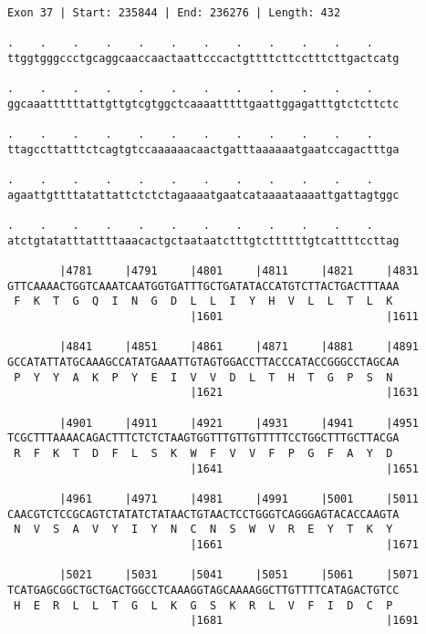 \documentclass{article}
\begin{document}
\begin{Verbatim}[fontfamily=courier]
Exon 37 | Start: 235844 | End: 236276 | Length: 432

.    .    .    .    .    .    .    .    .    .    .    .    
ttggtgggccctgcaggcaaccaactaattcccactgttttcttcctttcttgactcatg

.    .    .    .    .    .    .    .    .    .    .    .    
ggcaaattttttattgttgtcgtggctcaaaatttttgaattggagatttgtctcttctc

.    .    .    .    .    .    .    .    .    .    .    .    
ttagccttatttctcagtgtccaaaaaacaactgatttaaaaaatgaatccagactttga

.    .    .    .    .    .    .    .    .    .    .    .    
agaattgttttatattattctctctagaaaatgaatcataaaataaaattgattagtggc

.    .    .    .    .    .    .    .    .    .    .    .    
atctgtatatttattttaaacactgctaataatctttgtcttttttgtcattttccttag

        |4781     |4791     |4801     |4811     |4821     |4831
GTTCAAAACTGGTCAAATCAATGGTGATTTGCTGATATACCATGTCTTACTGACTTTAAA
 F  K  T  G  Q  I  N  G  D  L  L  I  Y  H  V  L  L  T  L  K 
                            |1601                         |1611

        |4841     |4851     |4861     |4871     |4881     |4891
GCCATATTATGCAAAGCCATATGAAATTGTAGTGGACCTTACCCATACCGGGCCTAGCAA
 P  Y  Y  A  K  P  Y  E  I  V  V  D  L  T  H  T  G  P  S  N 
                            |1621                         |1631

        |4901     |4911     |4921     |4931     |4941     |4951
TCGCTTTAAAACAGACTTTCTCTCTAAGTGGTTTGTTGTTTTTCCTGGCTTTGCTTACGA
 R  F  K  T  D  F  L  S  K  W  F  V  V  F  P  G  F  A  Y  D 
                            |1641                         |1651

        |4961     |4971     |4981     |4991     |5001     |5011
CAACGTCTCCGCAGTCTATATCTATAACTGTAACTCCTGGGTCAGGGAGTACACCAAGTA
 N  V  S  A  V  Y  I  Y  N  C  N  S  W  V  R  E  Y  T  K  Y 
                            |1661                         |1671

        |5021     |5031     |5041     |5051     |5061     |5071
TCATGAGCGGCTGCTGACTGGCCTCAAAGGTAGCAAAAGGCTTGTTTTCATAGACTGTCC
 H  E  R  L  L  T  G  L  K  G  S  K  R  L  V  F  I  D  C  P 
                            |1681                         |1691

\end{Verbatim}
\newpage
\end{document}
